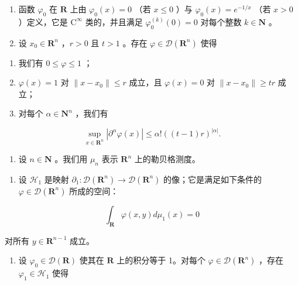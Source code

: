 \exercisesection{}

\begin{enumerate}
\def\labelenumi{\arabic{enumi})}
\item
  函数 \(\varphi_0\) 在 \(\mathbf{R}\) 上由 \(\varphi_0(x) = 0\) （若 \(x \leqslant 0\) ）与 \(\varphi_0(x) = e^{-1/x}\) （若 \(x > 0\) ）定义，它是 \(\mathrm{C}^\infty\) 类的，并且满足 \(\varphi_0^{(k)}(0) = 0\) 对每个整数 \(k \in \mathbf{N}\) 。
\item
  设 \(x_0 \in \mathbf{R}^n\) ，\(r > 0\) 且 \(t > 1\) 。存在 \(\varphi \in \mathcal{D}(\mathbf{R}^n)\) 使得
\end{enumerate}

\begin{enumerate}
\def\labelenumi{(\roman{enumi})}
\item
  我们有 \(0 \leqslant \varphi \leqslant 1\) ；
\item
  \(\varphi(x)=1\) 对 \(\|x-x_{0}\|\leqslant r\) 成立，且 \(\varphi(x)=0\) 对 \(\|x-x_{0}\|\geqslant tr\) 成立；
\item
  对每个 \(\alpha \in \mathbf{N}^n\) ，我们有
\end{enumerate}

\[
\sup _ {x \in \mathbf {R} ^ {n}} | \partial^ {\alpha} \varphi (x) | \leqslant \alpha ! ((t - 1) r) ^ {| \alpha |}.
\]

\begin{enumerate}
\def\labelenumi{\arabic{enumi})}
\setcounter{enumi}{2}
\tightlist
\item
  设 \(n \in \mathbf{N}\) 。我们用 \(\mu_n\) 表示 \(\mathbf{R}^n\) 上的勒贝格测度。
\end{enumerate}

\begin{enumerate}
\def\labelenumi{\alph{enumi})}
\tightlist
\item
  设 \(\mathcal{H}_1\) 是映射 \(\partial_1\colon \mathcal{D}(\mathbf{R}^n)\to \mathcal{D}(\mathbf{R}^n)\) 的像；它是满足如下条件的 \(\varphi \in \mathcal{D}(\mathbf{R}^n)\) 所成的空间：
\end{enumerate}

\[
\int_ {\mathbf {R}} \varphi (x, y) d \mu_ {1} (x) = 0
\]

对所有 \(y \in \mathbf{R}^{n-1}\) 成立。

\begin{enumerate}
\def\labelenumi{\alph{enumi})}
\setcounter{enumi}{1}
\tightlist
\item
  设 \(\varphi_0\in \mathcal{D}(\mathbf{R})\) 使其在 \(\mathbf{R}\) 上的积分等于 1。对每个 \(\varphi \in \mathcal{D}(\mathbf{R}^n)\) ，存在 \(\varphi_{1}\in \mathcal{H}_{1}\) 使得
\end{enumerate}

